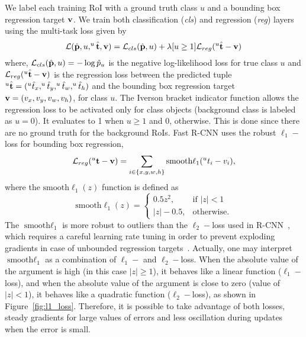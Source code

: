 We label each training RoI with a ground truth class $u$ and a bounding box regression target $\mathbf{v}$.
We train both classification ({\it cls}) and regression ({\it reg}) layers using the multi-task loss given by
%
\begin{equation}
 \mathcal{L} (\hat {\mathbf{p}},u,^u\hat {\mathbf{t}}, \mathbf{v})=
 \mathcal{L}_{cls} (\hat {\mathbf{p}}, u) +
 \lambda[u\geq1]\mathcal{L}_{reg} (^u\hat {\mathbf{t}} - \mathbf{v})
 \label{eq:loss_multi}
\end{equation}
%
where, $\mathcal{L}_{cls} (\hat {\mathbf{p}}, u) = -\log \hat p_u$  is the negative log-likelihood loss for true class $u$ and
$\mathcal{L}_{reg} (^u\hat {\mathbf{t}} - \mathbf{v})$ is the regression loss between the predicted tuple $^{u}\hat{\mathbf{t}} = (^{u}\hat t_{x}, ^{u}\hat t_{y}, ^{u}\hat t_{w}, ^{u}\hat t_{h})$ and the bounding box regression target $\mathbf{v} = (v_{x}, v_{y}, v_{w}, v_{h})$, for class $u$.
The Iverson bracket indicator function allows the regression loss to be activated only for class objects (background class is labeled as $u=0$).
It evaluates  to 1 when $u\geq1$ and 0, otherwise.
This is done since there are no ground truth for the background RoIs.
Fast R-CNN uses the robust $\ell_1-$loss for bounding box regression,
%
\begin{equation}
 \mathcal{L}_{{reg}} (^u\mathbf{t} - \mathbf{v})=
 \sum_{i \in \{x,y,w,h\}} \textrm{smooth}{\ell_1}(^ut_i - v_i),
 \label{eq:loss_loc}
\end{equation}
%
where the $\textrm{smooth}\ell_1 (z)$ function is defined as
%
\begin{equation}
 \textrm{smooth}\ell_1 (z) =
 \begin{cases}
 0.5z^2, & \textrm{if } |z|< 1\\
 |z| - 0.5, & \textrm{otherwise}.
 \end{cases}
 \label{eq:smooth_l1}
\end{equation}
%
The  $\textrm{smooth}\ell_1$ is more robust to outliers than the $\ell_2-$loss used in R-CNN~\cite{Girshick2016RCNN}, which requires a careful learning rate tuning in order to prevent exploding gradients in case of unbounded regression targets~\cite{Girshick2015}.
Actually, one may interpret $\textrm{smooth}\ell_1$ as a combination of $\ell_1-$ and $\ell_2-$loss.
When the absolute value of the argument is high (in this case $|z|\geq 1$), it behaves like a linear function ($\ell_1-$loss),
and when the absolute value of the argument is close to zero (value of $|z|< 1$), it behaves like a quadratic function ($\ell_2-$loss), as shown in Figure~\ref{fig:l1_loss}.
Therefore, it is possible to take advantage of both losses, steady gradients for large values of errors and less oscillation during updates when the error is small.
